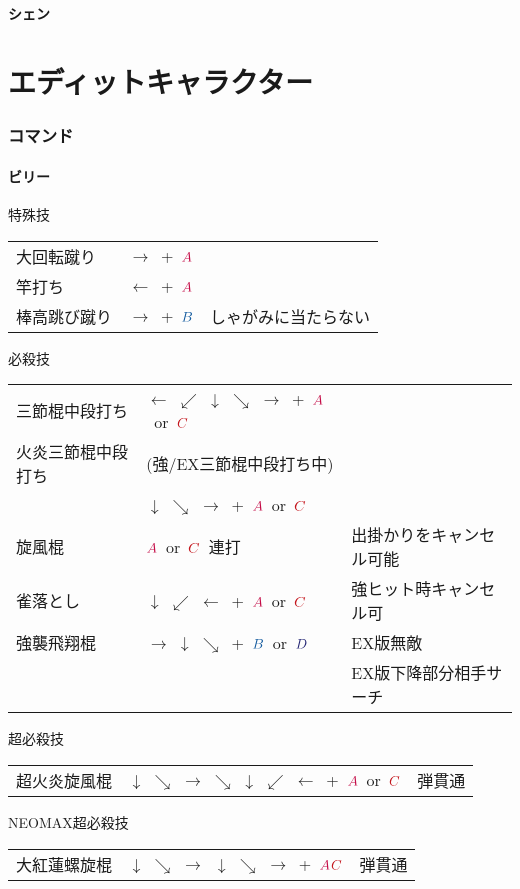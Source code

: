 \documentclass[a4j,11pt]{jarticle}
\def\A{$\textcolor{Acolor}{A}$}
\def\C{$\textcolor{Ccolor}{C}$}
\def\B{$\textcolor{Bcolor}{B}$}
\def\D{$\textcolor{Dcolor}{D}$}
\def\hado{$\downarrow$ $\searrow$ $\rightarrow$}%
\def\tatsu{$\downarrow$ $\swarrow$ $\leftarrow$}%
\def\syoryu{$\rightarrow$ $\downarrow$ $\searrow$}%
\def\yoga{$\leftarrow$ $\swarrow$ $\downarrow$ $\searrow$ $\rightarrow$}%
\def\ryuko{$\downarrow$ $\searrow$ $\rightarrow$ $\searrow$ $\downarrow$ $\swarrow$ $\leftarrow$}%
\begin{document}
\subsection{シェン}
\newpage
\part{エディットキャラクター}%
\section{コマンド}
\subsection{ビリー}
\begin{itembox}[l]{特殊技}
\begin{tabular}{lll}
大回転蹴り&$\rightarrow$\ +\ \A&\\%
竿打ち&$\leftarrow$\ +\ \A&\\%
棒高跳び蹴り&$\rightarrow$\ +\ \B&しゃがみに当たらない%
\end{tabular}
\end{itembox}
\begin{itembox}[l]{必殺技}
\begin{tabular}{lll}
三節棍中段打ち&\yoga\ +\ \A\ or\ \C&\\%
火炎三節棍中段打ち&(強/EX三節棍中段打ち中)&\\
&\hado\ +\ \A\ or\ \C&\\
旋風棍&\A\ or\ \C\ 連打&出掛かりをキャンセル可能\\%
雀落とし&\tatsu\ +\ \A\ or\ \C&強ヒット時キャンセル可\\%
強襲飛翔棍&\syoryu\ +\ \B\ or\ \D&EX版無敵\\&&EX版下降部分相手サーチ%
\end{tabular}
\end{itembox}
\begin{itembox}[l]{超必殺技}
\begin{tabular}{lll}
超火炎旋風棍&\ryuko\ +\ \A\ or\ \C&弾貫通%
\end{tabular}
\end{itembox}
\begin{itembox}[l]{NEOMAX超必殺技}
\begin{tabular}{lll}
大紅蓮螺旋棍&\hado\ \hado\ +\ \A\C&弾貫通%
\end{tabular}
\end{itembox}
\newpage
\end{document}
